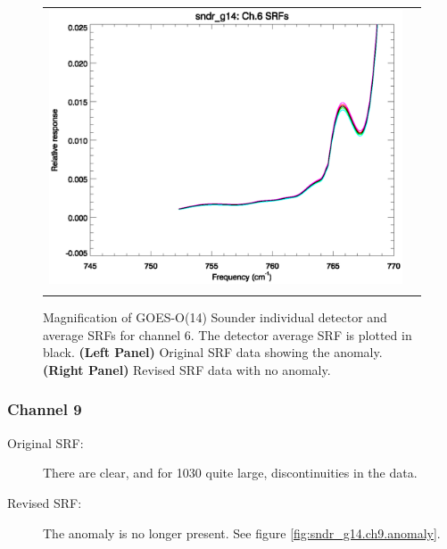 \begin{figure}[htp]
\begin{tabular}{c c}
    \includegraphics[scale=0.5,trim=0 40 0 0]{graphics/zoom_anomaly/revised/sndr_g14.ch6.srf.eps} \\\\
  \end{tabular}
  \caption{Magnification of GOES-O(14) Sounder individual detector and average SRFs for channel 6. The detector average SRF is plotted in black. \textbf{(Left Panel)} Original SRF data showing the anomaly. \textbf{(Right Panel)} Revised SRF data with no anomaly.}
  \label{fig:sndr_g14.ch6.anomaly}
\end{figure}

\subsubsection{Channel 9}
\begin{description}
  \item[Original SRF:] There are clear, and for 1030\invcm{} quite large, discontinuities in the data.
  \item[Revised SRF:]  The anomaly is no longer present. See figure \ref{fig:sndr_g14.ch9.anomaly}.
\end{description}

